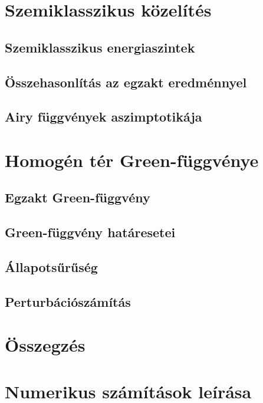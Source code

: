 \documentclass[pdftex,12pt,a4paper]{article}
\begin{document}
\section{Szemiklasszikus közelítés}
	
	\subsection{Szemiklasszikus energiaszintek}
		
	\subsection{Összehasonlítás az egzakt eredménnyel}
		
	\subsection{Airy függvények aszimptotikája}
		
\section{Homogén tér Green-függvénye}
	
	\subsection{Egzakt Green-függvény}
		
	\subsection{Green-függvény határesetei}
		
	\subsection{Állapotsűrűség}
		
	\subsection{Perturbációszámítás}
		
\section{Összegzés}
	
\appendix
%	
\section{Numerikus számítások leírása}
	
	
    \newpage
	
    
\end{document}
